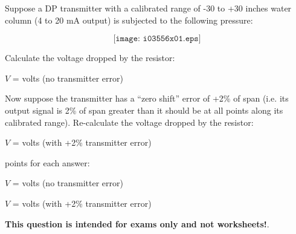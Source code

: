 

Suppose a DP transmitter with a calibrated range of -30 to +30 inches water column (4 to 20 mA output) is subjected to the following pressure:

$$\texttt{[image: i03556x01.eps]}$$

Calculate the voltage dropped by the resistor:

\vskip 10pt

$V$ = \underbar{\hskip 50pt} volts (no transmitter error)

\vskip 30pt

Now suppose the transmitter has a ``zero shift'' error of +2\% of span (i.e. its output signal is 2\% of span greater than it should be at all points along its calibrated range).  Re-calculate the voltage dropped by the resistor:

\vskip 10pt

$V$ = \underbar{\hskip 50pt} volts (with +2\% transmitter error)







 points for each answer:

\vskip 10pt

$V$ =  volts (no transmitter error)

$V$ =  volts (with +2\% transmitter error)







{\bf This question is intended for exams only and not worksheets!}.



